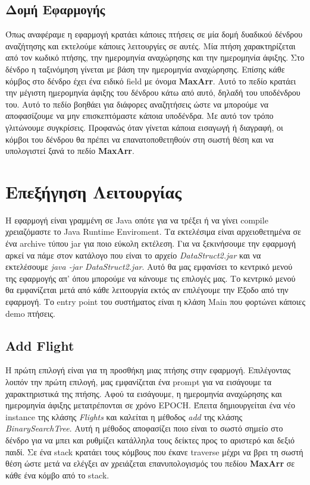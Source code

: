 \documentclass[a4paper]{article}
\begin{document}
\subsection{Δομή Εφαρμογής}
Όπως αναφέραμε η εφαρμογή κρατάει κάποιες πτήσεις σε μία δομή δυαδικού δένδρου
αναζήτησης και εκτελούμε κάποιες λειτουργίες σε αυτές. Μία πτήση χαρακτηρίζεται
από τον κωδικό πτήσης, την ημερομηνία αναχώρησης και την ημερομηνία άφιξης. Στο
δένδρο η ταξινόμηση γίνεται με βάση την ημερομηνία αναχώρησης. Επίσης κάθε
κόμβος στο δένδρο έχει ένα ειδικό field με όνομα \textbf{MaxArr}. Αυτό το πεδίο
κρατάει την μέγιστη ημερομηνία άφιξης του δένδρου κάτω από αυτό, δηλαδή του
υποδένδρου του. Αυτό το πεδίο βοηθάει για διάφορες αναζητήσεις ώστε να μπορούμε
να αποφασίζουμε να μην επισκεπτόμαστε κάποια υποδένδρα. Με αυτό τον τρόπο
γλιτώνουμε συγκρίσεις. Προφανώς όταν γίνεται κάποια εισαγωγή ή διαγραφή, οι
κόμβοι του δένδρου θα πρέπει να επανατοποθετηθούν στη σωστή θέση και να
υπολογιστεί ξανά το πεδίο \textbf{MaxArr}.

\section{Επεξήγηση Λειτουργίας}
Η εφαρμογή είναι γραμμένη σε Java οπότε για να τρέξει ή να γίνει compile
χρειαζόμαστε το Java Runtime Enviroment. Τα εκτελέσιμα είναι αρχειοθετημένα σε
ένα archive τύπου jar για ποιο εύκολη εκτέλεση. Για να ξεκινήσουμε την εφαρμογή
αρκεί να πάμε στον κατάλογο που είναι το αρχείο \emph{DataStruct2.jar} και να
εκτελέσουμε \emph{java -jar DataStruct2.jar}. Αυτό θα μας εμφανίσει το κεντρικό
μενού της εφαρμογής απ' όπου μπορούμε να κάνουμε τις επιλογές μας. Το κεντρικό
μενού θα εμφανίζεται μετά από κάθε λειτουργία εκτός αν επιλέγουμε την Έξοδο από
την εφαρμογή. Το entry point του συστήματος είναι η κλάση Main που φορτώνει
κάποιες demo πτήσεις.

\subsection{Add Flight}
Η πρώτη επιλογή είναι για τη προσθήκη μιας πτήσης στην εφαρμογή. Επιλέγοντας
λοιπόν την πρώτη επιλογή, μας εμφανίζεται ένα prompt για να εισάγουμε τα
χαρακτηριστικά της πτήσης. Αφού τα εισάγουμε, η ημερομηνία αναχώρησης και
ημερομηνία άφιξης μετατρέπονται σε χρόνο EPOCH. Έπειτα δημιουργείται ένα νέο
instance της κλάσης \emph{Flights} και καλείται η μέθοδος \emph{add} της κλάσης
\emph{BinarySearchTree}. Αυτή η μέθοδος αποφασίζει ποιο είναι το σωστό σημείο
στο δένδρο για να μπει και ρυθμίζει κατάλληλα τους δείκτες προς το αριστερό και
δεξιό παιδί. Σε ένα stack κρατάει τους κόμβους που έκανε traverse μέχρι να βρει
τη σωστή θέση ώστε μετά να ελέγξει αν χρειάζεται επανυπολογισμός του πεδίου
\textbf{MaxArr} σε κάθε ένα κόμβο από το stack.
\end{document}
